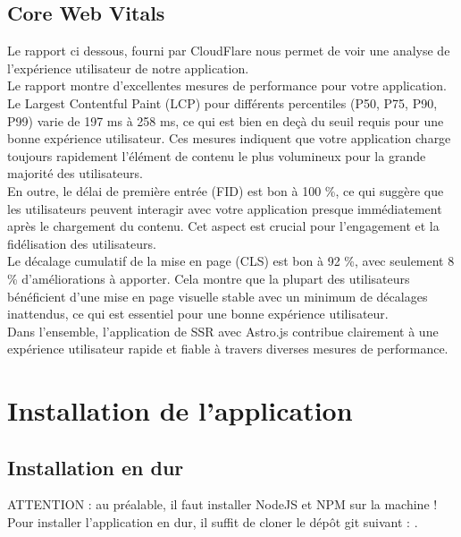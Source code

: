 \documentclass[12pt, a4paper, oneside]{thesis}
\begin{document}
\subsection{Core Web Vitals}

Le rapport ci dessous, fourni par CloudFlare nous permet de voir une analyse de l'expérience utilisateur de notre application.\\

Le rapport montre d'excellentes mesures de performance pour votre application. Le Largest Contentful Paint (LCP) pour différents percentiles (P50, P75, P90, P99) varie de 197 ms à 258 ms, ce qui est bien en deçà du seuil requis pour une bonne expérience utilisateur. Ces mesures indiquent que votre application charge toujours rapidement l'élément de contenu le plus volumineux pour la grande majorité des utilisateurs.\\

En outre, le délai de première entrée (FID) est bon à 100 \%, ce qui suggère que les utilisateurs peuvent interagir avec votre application presque immédiatement après le chargement du contenu. Cet aspect est crucial pour l'engagement et la fidélisation des utilisateurs.\\

Le décalage cumulatif de la mise en page (CLS) est bon à 92 \%, avec seulement 8 \% d'améliorations à apporter. Cela montre que la plupart des utilisateurs bénéficient d'une mise en page visuelle stable avec un minimum de décalages inattendus, ce qui est essentiel pour une bonne expérience utilisateur.\\

Dans l'ensemble, l'application de SSR avec Astro.js contribue clairement à une expérience utilisateur rapide et fiable à travers diverses mesures de performance.


\newpage
\section{Installation de l'application}

\subsection{Installation en dur}

ATTENTION : au préalable, il faut installer NodeJS et NPM sur la machine !\\

Pour installer l'application en dur, il suffit de cloner le dépôt git suivant : \url{}{}.\\
\end{document}
